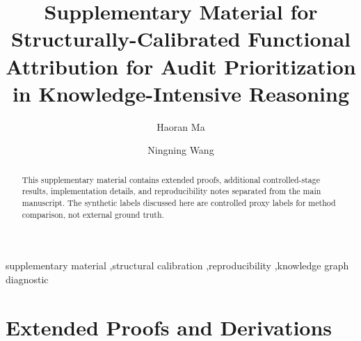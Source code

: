 \documentclass[a4paper,fleqn]{cas-sc}
\begin{document}
\let\WriteBookmarks\relax
\def\floatpagepagefraction{1}
\def\textpagefraction{.001}


\title[mode=title]{Supplementary Material for Structurally-Calibrated Functional Attribution for Audit Prioritization in Knowledge-Intensive Reasoning}

\author[1]{Haoran Ma}

\author[1,2]{Ningning Wang}




\begin{abstract}
This supplementary material contains extended proofs, additional controlled-stage results, implementation details, and reproducibility notes separated from the main manuscript. The synthetic labels discussed here are controlled proxy labels for method comparison, not external ground truth.
\end{abstract}

\begin{keywords}
supplementary material \sep structural calibration \sep reproducibility \sep knowledge graph diagnostic
\end{keywords}

\maketitle

\appendix
\makeatletter
\renewcommand{\thetable}{\@Alph\c@section.\arabic{table}}
\renewcommand{\thefigure}{\@Alph\c@section.\arabic{figure}}
\renewcommand{\thealgorithm}{\@Alph\c@section.\arabic{algorithm}}
\renewcommand{\theequation}{\@Alph\c@section.\arabic{equation}}
\makeatother

\section{Extended Proofs and Derivations}
\label{app:proofs}
\end{document}
